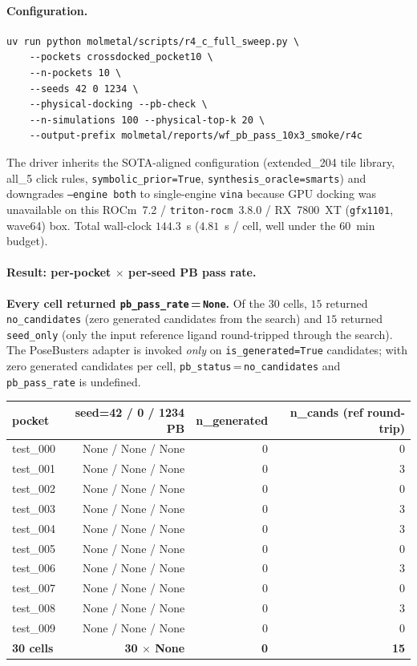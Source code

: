 \paragraph{Configuration.}
\begin{verbatim}
uv run python molmetal/scripts/r4_c_full_sweep.py \
    --pockets crossdocked_pocket10 \
    --n-pockets 10 \
    --seeds 42 0 1234 \
    --physical-docking --pb-check \
    --n-simulations 100 --physical-top-k 20 \
    --output-prefix molmetal/reports/wf_pb_pass_10x3_smoke/r4c
\end{verbatim}
The driver inherits the SOTA-aligned configuration
(extended\_204 tile library, all\_5 click rules,
\texttt{symbolic\_prior=True}, \texttt{synthesis\_oracle=smarts})
and downgrades \texttt{--engine both} to single-engine
\texttt{vina} because GPU docking was unavailable on this
ROCm~7.2 / \texttt{triton-rocm}~3.8.0 / RX~7800~XT (\texttt{gfx1101},
wave64) box.  Total wall-clock $144.3$~s ($4.81$~s / cell, well
under the $60$~min budget).

\paragraph{Result: per-pocket $\times$ per-seed PB pass rate.}
\textbf{Every cell returned \texttt{pb\_pass\_rate}\,=\,\texttt{None}.}  Of
the $30$ cells, $15$ returned \texttt{no\_candidates} (zero
generated candidates from the search) and $15$ returned
\texttt{seed\_only} (only the input reference ligand round-tripped
through the search).  The PoseBusters adapter is invoked
\emph{only} on \texttt{is\_generated=True} candidates; with zero
generated candidates per cell, \texttt{pb\_status}\,=\,\texttt{no\_candidates}
and \texttt{pb\_pass\_rate} is undefined.

\begin{center}
\small
\setlength{\tabcolsep}{4pt}
\begin{tabular}{lrrr}
\toprule
\textbf{pocket} & \textbf{seed=42 / 0 / 1234 PB} & \textbf{n\_generated} & \textbf{n\_cands (ref round-trip)} \\
\midrule
test\_000 & None / None / None & 0 & 0 \\
test\_001 & None / None / None & 0 & 3 \\
test\_002 & None / None / None & 0 & 0 \\
test\_003 & None / None / None & 0 & 3 \\
test\_004 & None / None / None & 0 & 3 \\
test\_005 & None / None / None & 0 & 0 \\
test\_006 & None / None / None & 0 & 3 \\
test\_007 & None / None / None & 0 & 0 \\
test\_008 & None / None / None & 0 & 3 \\
test\_009 & None / None / None & 0 & 0 \\
\midrule
\textbf{30 cells} & \textbf{30 $\times$ None} & \textbf{0} & \textbf{15} \\
\bottomrule
\end{tabular}
\end{center}

